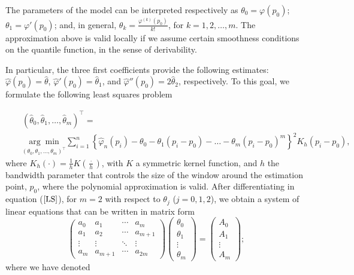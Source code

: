 \documentclass[preprint,12pt]{elsarticle}
\begin{document}
The parameters of the model can be interpreted respectively as $\theta_0={\varphi}(p_0)$; ${\theta}_1={\varphi'}(p_0)$; and, in general, ${\theta}_k=\frac{\varphi^{(k)}(p_0)}{k!}$, for $k=1,2,\ldots,m$. The approximation above is valid locally if we assume certain smoothness conditions on the quantile function, in the sense of derivability. 


In particular, the three first coefficients provide the following estimates: $\widehat{\varphi}(p_0)=\widehat{\theta}$, $\widehat{\varphi}'(p_0)=\widehat{\theta}_1$, and $\widehat{\varphi}''(p_0)=2\widehat{\theta}_2$, respectively.
To this goal, we formulate the following least squares problem

\begin{eqnarray}\label{LS}
&&\left(\widehat{\theta}_0,\widehat{\theta}_1,\ldots,\widehat{\theta}_m\right)^{\intercal}= \\
\nonumber &&\underset{\left({\theta}_0,\theta_1,\ldots, {\theta}_m\right)^{\intercal}}{\arg \min} \sum_{i=1}^n\left\{\widehat{\varphi}_n(p_i)-\theta_0-\theta_1(p_i-p_0)-\ldots-\theta_m(p_i-p_0)^m\right\}^2 K_h(p_i-p_0),
\end{eqnarray}
where $K_h(\cdot)=\frac{1}{h}K(\frac{\cdot}{h})$, with $K$ a symmetric kernel function, and $h$ the bandwidth parameter that controls the size of the window around the estimation point, $p_0$, where the polynomial approximation is valid.
After differentiating in equation ($\ref{LS}$), for $m=2$ with respect to $\theta_j$ ($j=0, 1, 2$), we obtain a system of linear equations that can be written in matrix form
\begin{equation}\label{score}
\left(\begin{array}{cccc}
a_0 & a_1&\cdots &a_m \\ 
a_{1} & a_2&\cdots &a_{m+1}\\
\vdots & \vdots &\ddots &\vdots \\ 
a_m & a_{m+1}&\cdots &a_{2 m} 
\end{array}\right)
\left(\begin{array}{c}
 \theta_0 \\ 
\theta_1 \\ 
\vdots \\
\theta_m
 \end{array}\right)=
\left(\begin{array}{c} 
A_0 \\ 
A_1 \\ 
\vdots \\
A_m
 \end{array}\right);
\end{equation}
where we have denoted
\end{document}
